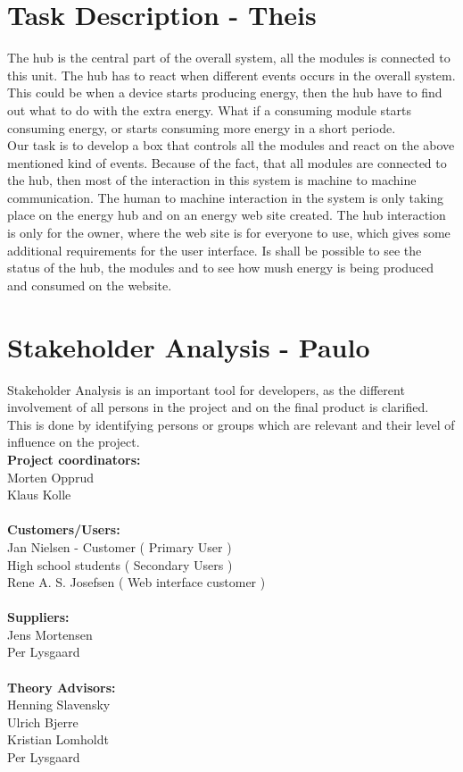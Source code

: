 \section{Task Description - Theis}
The hub is the central part of the overall system, all the modules is connected to this unit. The hub has to react when different events occurs in the overall system. This could be when a device starts producing energy, then the hub have to find out what to do with the extra energy. What if a consuming module starts consuming energy, or starts consuming more energy in a short periode. 
\\[0.2cm]
Our task is to develop a box that controls all the modules and react on the above mentioned kind of events. Because of the fact, that all modules are connected to the hub, then most of the interaction in this system is machine to machine communication. The human to machine interaction in the system is only taking place on the energy hub and on an energy web site created. The hub interaction is only for the owner, where the web site is for everyone to use, which gives some additional requirements for the user interface. Is shall be possible to see the status of the hub, the modules and to see how mush energy is being produced and consumed on the website.

\section{Stakeholder Analysis - Paulo}

Stakeholder Analysis is an important tool for developers, as the different involvement of all persons in the project and on the final product is clarified. This is done by identifying persons or groups which are relevant and their level of influence on the project.
\\[0.2cm]
\textbf{Project coordinators:}\\ Morten Opprud\\ Klaus Kolle\\
\\
\textbf{Customers/Users:}\\
Jan Nielsen - Customer ( Primary User )\\
High school students ( Secondary Users )\\
Rene A. S. Josefsen ( Web interface customer )\\
\\
\textbf{Suppliers:}\\
Jens Mortensen\\
Per Lysgaard\\
\\
\textbf{Theory Advisors:}\\
Henning Slavensky\\
Ulrich Bjerre\\
Kristian Lomholdt\\
Per Lysgaard\\

